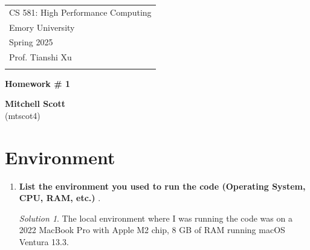 \documentclass[a4paper,12pt]{article}
\theoremstyle{definition}
\theoremstyle{remark}
\newtheorem*{solution}{Solution}
\begin{document}
	
	
	
	
	
	\thispagestyle{empty} %
	
	\begin{tabular}{p{15.5cm}} %
		{\large \sc CS 581:  High Performance Computing} \\
		Emory University \\ Spring 2025 \\ Prof. Tianshi Xu \\
		\hline %
		\\
	\end{tabular} %
	
	\vspace*{0.3cm} %
	
	\begin{center} %
		{\Large \bf Homework \# 1} %
		\vspace{2mm}
		
		{\bf Mitchell Scott}\\ (mtscot4) %
		
	\end{center}  
	
	\vspace{0.4cm}
	
	
	
	\section{Environment}
	\begin{enumerate}
		
		\item {\bf List the environment you used to run the code (Operating System, CPU, RAM, etc.) }. 
	
		\begin{solution}
			The local environment where I was running the code was on a 2022 MacBook Pro with Apple M2 chip, 8 GB of RAM running macOS Ventura 13.3. 
		\end{solution}
	\end{enumerate}
\end{document}
